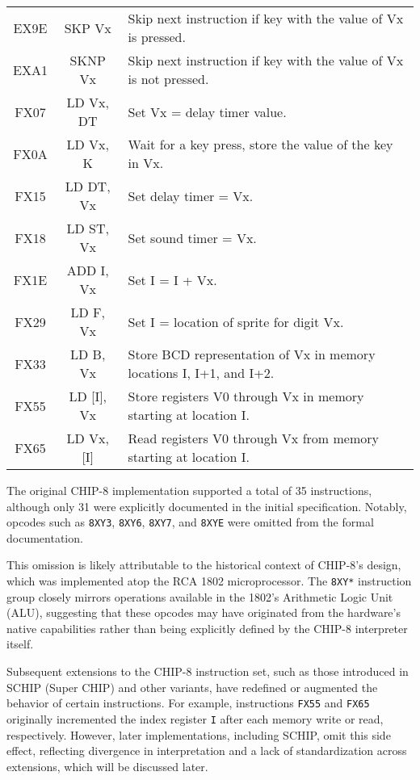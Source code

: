 \begin{longtable}{|c|c|p{9cm}|}
EX9E & SKP Vx & Skip next instruction if key with the value of Vx is pressed. \\
EXA1 & SKNP Vx & Skip next instruction if key with the value of Vx is not pressed. \\
FX07 & LD Vx, DT & Set Vx = delay timer value. \\
FX0A & LD Vx, K & Wait for a key press, store the value of the key in Vx. \\
FX15 & LD DT, Vx & Set delay timer = Vx. \\
FX18 & LD ST, Vx & Set sound timer = Vx. \\
FX1E & ADD I, Vx & Set I = I + Vx. \\
FX29 & LD F, Vx & Set I = location of sprite for digit Vx. \\
FX33 & LD B, Vx & Store BCD representation of Vx in memory locations I, I+1, and I+2. \\
FX55 & LD [I], Vx & Store registers V0 through Vx in memory starting at location I. \\
FX65 & LD Vx, [I] & Read registers V0 through Vx from memory starting at location I. \\
\end{longtable}

\par The original CHIP-8 implementation supported a total of 35 instructions, although only 31 were explicitly documented in the initial specification. Notably, opcodes such as \texttt{8XY3}, \texttt{8XY6}, \texttt{8XY7}, and \texttt{8XYE} were omitted from the formal documentation.

\par This omission is likely attributable to the historical context of CHIP-8’s design, which was implemented atop the RCA 1802 microprocessor. The \texttt{8XY*} instruction group closely mirrors operations available in the 1802’s Arithmetic Logic Unit (ALU), suggesting that these opcodes may have originated from the hardware's native capabilities rather than being explicitly defined by the CHIP-8 interpreter itself.

\par Subsequent extensions to the CHIP-8 instruction set, such as those introduced in SCHIP (Super CHIP) and other variants, have redefined or augmented the behavior of certain instructions. For example, instructions \texttt{FX55} and \texttt{FX65} originally incremented the index register \texttt{I} after each memory write or read, respectively. However, later implementations, including SCHIP, omit this side effect, reflecting divergence in interpretation and a lack of standardization across extensions, which will be discussed later.

